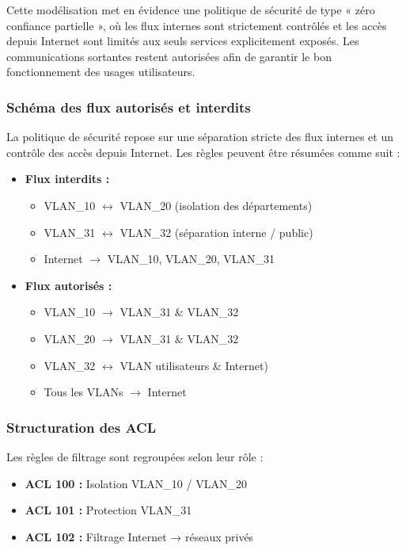 \documentclass[12pt,a4paper, oneside]{memoir}
\begin{document}
Cette modélisation met en évidence une politique de sécurité de type « zéro confiance partielle », où les flux internes sont strictement contrôlés et les accès depuis Internet sont limités aux seuls services explicitement exposés. Les communications sortantes restent autorisées afin de garantir le bon fonctionnement des usages utilisateurs.

\subsubsection{Schéma des flux autorisés et interdits}

La politique de sécurité repose sur une séparation stricte des flux internes et un contrôle des accès depuis Internet. Les règles peuvent être résumées comme suit :

\begin{itemize}
	\item \textbf{Flux interdits :}
	\begin{itemize}
		\item VLAN\_10 $\leftrightarrow$ VLAN\_20 (isolation des départements)
		\item VLAN\_31 $\leftrightarrow$ VLAN\_32 (séparation interne / public)
		\item Internet $\rightarrow$ VLAN\_10, VLAN\_20, VLAN\_31
	\end{itemize}
	
	\item \textbf{Flux autorisés :}
	\begin{itemize}
		\item VLAN\_10 $\rightarrow$ VLAN\_31 \& VLAN\_32
		\item VLAN\_20 $\rightarrow$ VLAN\_31 \& VLAN\_32
		\item VLAN\_32 $\leftrightarrow$ VLAN utilisateurs \& Internet)
		\item Tous les VLANs $\rightarrow$ Internet
	\end{itemize}
\end{itemize}
\subsubsection{Structuration des ACL}

Les règles de filtrage sont regroupées selon leur rôle :

\begin{itemize}
	\item \textbf{ACL 100 :} Isolation VLAN\_10 / VLAN\_20
	\item \textbf{ACL 101 :} Protection VLAN\_31
	\item \textbf{ACL 102 :} Filtrage Internet → réseaux privés
\end{itemize}
\end{document}
